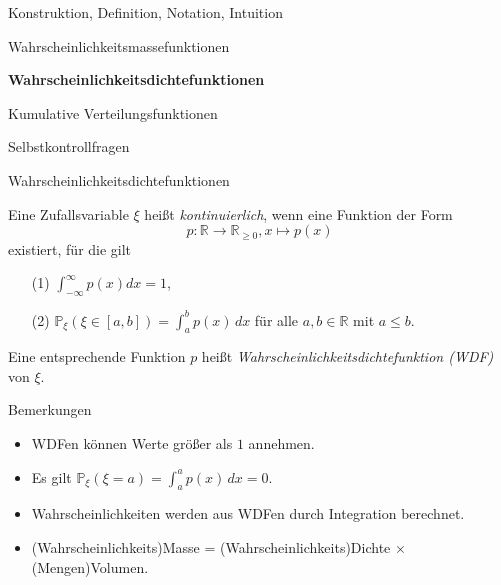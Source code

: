 \documentclass[
  8pt,
  ignorenonframetext,
]{beamer}
\begin{document}
\begin{frame}{}
\protect\hypertarget{section-7}{}
\large
{}
\vfill

Konstruktion, Definition, Notation, Intuition

Wahrscheinlichkeitsmassefunktionen

\textbf{Wahrscheinlichkeitsdichtefunktionen}

Kumulative Verteilungsfunktionen

Selbstkontrollfragen \vfill
\end{frame}

\begin{frame}{Wahrscheinlichkeitsdichtefunktionen}
\protect\hypertarget{wahrscheinlichkeitsdichtefunktionen}{}
\small
\begin{definition}
Eine Zufallsvariable $\xi$ heißt \textit{kontinuierlich}, wenn eine Funktion der Form
\begin{equation}
p: \mathbb{R} \to \mathbb{R}_{\ge 0}, x \mapsto p(x)
\end{equation}
existiert, für die gilt
\begin{itemize}
\item[(1)] $\int_{-\infty}^{\infty}p(x)dx = 1$,
\item[(2)] $\mathbb{P}_\xi(\xi \in [a,b]) = \int_a^b p(x)\,dx$ für alle $a,b\in\mathbb{R}$ mit $a \le b$.
\end{itemize}
Eine entsprechende Funktion $p$ heißt \textit{Wahrscheinlichkeitsdichtefunktion (WDF)} von $\xi$.
\end{definition}

Bemerkungen

\begin{itemize}
\justifying
\item WDFen können Werte größer als $1$ annehmen.
\item Es gilt $\mathbb{P}_\xi(\xi = a) = \int_a^a p(x) \,dx = 0$.
\item Wahrscheinlichkeiten werden aus WDFen durch Integration berechnet.
\item (Wahrscheinlichkeits)Masse = (Wahrscheinlichkeits)Dichte $\times$ (Mengen)Volumen.
\end{itemize}
\end{frame}
\end{document}
